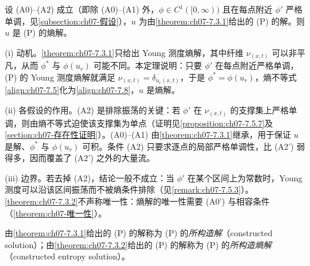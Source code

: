 \documentclass[../../main.tex]{subfiles}%
\begin{document}
\begin{theorem}\label{theorem:ch07-7.3.2}
设 (A0)--(A2) 成立（即除 (A0)--(A1) 外，$\phi\in C^1([0,\infty))$ 且在每点附近 $\phi'$ 严格单调，见\cref{subsection:ch07-假设}），$u$ 为由\cref{theorem:ch07-7.3.1}给出的 (P) 的解。则 $u$ 是 (P) 的熵解。
\end{theorem}

\begin{remark}\label{remark:ch07-7.3.2动机}
(i) 动机。\cref{theorem:ch07-7.3.1}只给出 Young 测度熵解，其中纤维 $\nu_{(x,t)}$ 可以非平凡，从而 $\phi^*$ 与 $\phi(u_r)$ 可能不同。本定理说明：只要 $\phi'$ 在每点附近严格单调，(P) 的 Young 测度熵解就满足 $\nu_{(x,t)}=\delta_{u_r(x,t)}$，于是 $\phi^*=\phi(u_r)$，熵不等式\eqref{align:ch07-7.5}化为\eqref{align:ch07-7.8}，$u$ 是熵解。

(ii) 各假设的作用。(A2) 是排除振荡的关键：若 $\phi'$ 在 $\nu_{(x,t)}$ 的支撑集上严格单调，则由熵不等式迫使该支撑集为单点（证明见\cref{proposition:ch07-7.5.7}及\cref{section:ch07-存在性证明}）。(A0)--(A1) 由\cref{theorem:ch07-7.3.1}继承，用于保证 $u$ 是解、$\phi^*$ 与 $\phi(u_r)$ 可积。条件 (A2) 只要求逐点的局部严格单调性，比 (A2') 弱得多，因而覆盖了 (A2') 之外的大量流。

(iii) 边界。若去掉 (A2)，结论一般不成立：当 $\phi'$ 在某个区间上为常数时，Young 测度可以沿该区间振荡而不被熵条件排除（见\cref{remark:ch07-7.5.3}）。\cref{theorem:ch07-7.3.2}不声称唯一性：熵解的唯一性需要 (A0') 与相容条件（\cref{theorem:ch07-唯一性}）。
\end{remark}

\begin{definition}\label{definition:ch07-构造解}
由\cref{theorem:ch07-7.3.1}给出的 (P) 的解称为 (P) 的\emph{所构造解}（constructed solution）；由\cref{theorem:ch07-7.3.2}给出的 (P) 的解称为 (P) 的\emph{所构造熵解}（constructed entropy solution）。
\end{definition}
\end{document}
